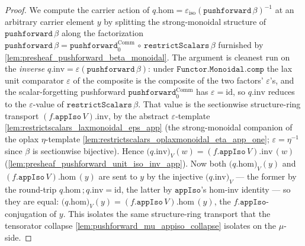 \begin{proof}
  \leanok
  We compute the carrier action of \(q.\mathrm{hom} = \varepsilon_{\mathrm{iso}}(\mathtt{pushforward}\,
  \beta)^{-1}\) at an arbitrary carrier element \(y\) by splitting the strong-monoidal structure of
  \(\mathtt{pushforward}\,\beta\) along the factorization
  \(\mathtt{pushforward}\,\beta = \mathtt{pushforward}_0^{\mathrm{Comm}} \,\circ\,
  \mathtt{restrictScalars}\,\beta\) furnished by
  \cref{lem:presheaf_pushforward_beta_monoidal}. The argument is cleanest run on the \emph{inverse}
  \(q.\mathrm{inv} = \varepsilon(\mathtt{pushforward}\,\beta)\): under \(\mathtt{Functor.Monoidal.comp}\)
  the lax unit comparator \(\varepsilon\) of the composite is the composite of the two factors'
  \(\varepsilon\)'s, and the scalar-forgetting pushforward \(\mathtt{pushforward}_0^{\mathrm{Comm}}\)
  has \(\varepsilon = \mathrm{id}\), so \(q.\mathrm{inv}\) reduces to the \(\varepsilon\)-value of
  \(\mathtt{restrictScalars}\,\beta\). That value is the sectionwise structure-ring transport
  \((f.\mathtt{appIso}\,V).\mathrm{inv}\), by the abstract \(\varepsilon\)-template
  \cref{lem:restrictscalars_laxmonoidal_eps_app} (the strong-monoidal companion of the oplax
  \(\eta\)-template \cref{lem:restrictscalars_oplaxmonoidal_eta_app_one}; \(\varepsilon = \eta^{-1}\)
  since \(\beta\) is sectionwise bijective). Hence
  \(\bigl(q.\mathrm{inv}\bigr)_V (w) = (f.\mathtt{appIso}\,V).\mathrm{inv}\,(w)\)
  (\cref{lem:presheaf_pushforward_unit_iso_inv_app}). Now both \(\bigl(q.\mathrm{hom}\bigr)_V(y)\) and
  \((f.\mathtt{appIso}\,V).\mathrm{hom}\,(y)\) are sent to \(y\) by the injective
  \(\bigl(q.\mathrm{inv}\bigr)_V\) — the former by the round-trip \(q.\mathrm{hom}\,;q.\mathrm{inv} =
  \mathrm{id}\), the latter by \(\mathtt{appIso}\)'s hom-inv identity — so they are equal:
  \(\bigl(q.\mathrm{hom}\bigr)_V (y) = (f.\mathtt{appIso}\,V).\mathrm{hom}\,(y)\), the
  \(f.\mathtt{appIso}\)-conjugation of \(y\). This isolates the same structure-ring transport that the
  tensorator collapse \cref{lem:pushforward_mu_appiso_collapse} isolates on the \(\mu\)-side.
\end{proof}

